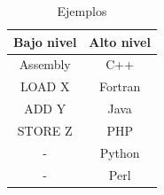 \documentclass[11pt, letterpaper, spanish]{article}
\begin{document}
{  
    \begin{table}[h]
        \centering
        \resizebox{4.5 cm}{!} {
        \begin{tabular}{| c | c |}
            \hline
            Bajo nivel  & Alto nivel \\ \hline
            Assembly & C++ \\
            LOAD X      & Fortran \\
            ADD Y       & Java \\
            STORE Z     & PHP \\
            -           & Python \\
            -           & Perl \\ \hline
        \end{tabular}}
        \caption{Ejemplos}
   \end{table}
   
}
\end{document}
